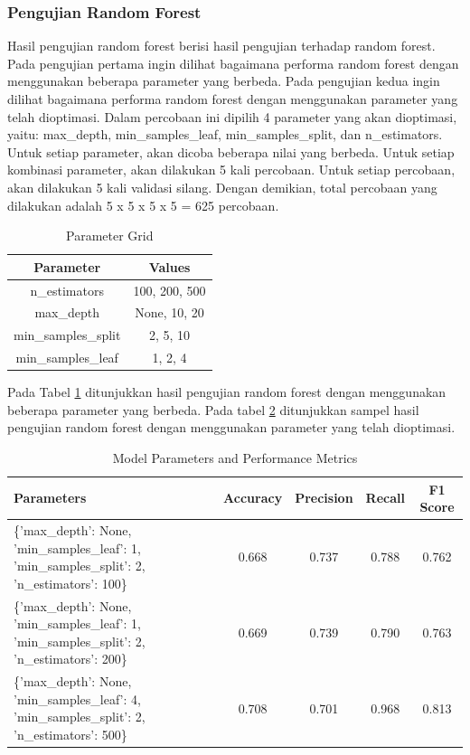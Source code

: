 \subsubsection{Pengujian Random Forest}
Hasil pengujian random forest berisi hasil pengujian terhadap random forest. Pada pengujian pertama ingin dilihat bagaimana performa random forest dengan menggunakan beberapa parameter yang berbeda. Pada pengujian kedua ingin dilihat bagaimana performa random forest dengan menggunakan parameter yang telah dioptimasi.
Dalam percobaan ini dipilih 4 parameter yang akan dioptimasi, yaitu: max\_depth, min\_samples\_leaf, min\_samples\_split, dan n\_estimators. Untuk setiap parameter, akan dicoba beberapa nilai yang berbeda. Untuk setiap kombinasi parameter, akan dilakukan 5 kali percobaan. Untuk setiap percobaan, akan dilakukan 5 kali validasi silang. Dengan demikian, total percobaan yang dilakukan adalah 5 x 5 x 5 x 5 = 625 percobaan.

\begin{table}[h]
    \centering
    \begin{tabular}{|c|c|}
    \hline
    \textbf{Parameter} & \textbf{Values} \\
    \hline
    n\_estimators & 100, 200, 500 \\
    \hline
    max\_depth & None, 10, 20 \\
    \hline
    min\_samples\_split & 2, 5, 10 \\
    \hline
    min\_samples\_leaf & 1, 2, 4 \\
    \hline
    \end{tabular}
    \caption{Parameter Grid}
    \label{table:param_grid}
    \end{table}

Pada Tabel \ref{table:param_grid} ditunjukkan hasil pengujian random forest dengan menggunakan beberapa parameter yang berbeda. Pada tabel \ref{table:sampel_hasil_pengujian_random_forest} ditunjukkan sampel hasil pengujian random forest dengan menggunakan parameter yang telah dioptimasi.


\begin{table}[h]
    \centering
    \begin{tabularx}{\textwidth}{|X|c|c|c|c|}
    \hline
    \textbf{Parameters} & \textbf{Accuracy} & \textbf{Precision} & \textbf{Recall} & \textbf{F1 Score} \\
    \hline
    \{'max\_depth': None, 'min\_samples\_leaf': 1, 'min\_samples\_split': 2, 'n\_estimators': 100\} & 0.668 & 0.737 & 0.788 & 0.762 \\
    \hline
    \{'max\_depth': None, 'min\_samples\_leaf': 1, 'min\_samples\_split': 2, 'n\_estimators': 200\} & 0.669 & 0.739 & 0.790 & 0.763 \\
    \hline
    \{'max\_depth': None, 'min\_samples\_leaf': 4, 'min\_samples\_split': 2, 'n\_estimators': 500\} & 0.708 & 0.701 & 0.968 & 0.813 \\
    \hline
    \end{tabularx}
    \caption{Model Parameters and Performance Metrics}
    \label{table:sampel_hasil_pengujian_random_forest}
\end{table}

